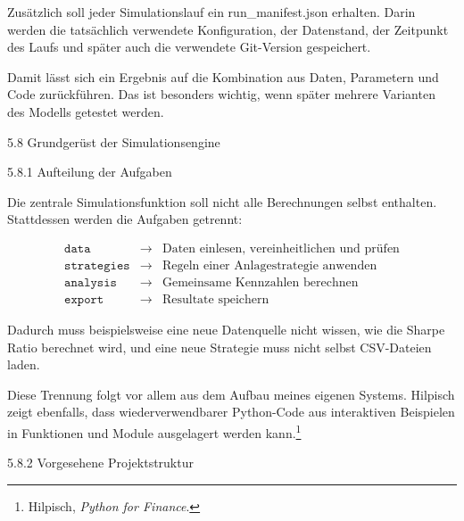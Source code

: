 \documentclass[
  ngerman,
  a4paper,
  DIV=11,
  oneside]{scrreprt}
\begin{document}
Zusätzlich soll jeder Simulationslauf ein run\_manifest.json erhalten.
Darin werden die tatsächlich verwendete Konfiguration, der Datenstand,
der Zeitpunkt des Laufs und später auch die verwendete Git-Version
gespeichert.

Damit lässt sich ein Ergebnis auf die Kombination aus Daten, Parametern
und Code zurückführen. Das ist besonders wichtig, wenn später mehrere
Varianten des Modells getestet werden.

5.8 Grundgerüst der Simulationsengine

5.8.1 Aufteilung der Aufgaben

Die zentrale Simulationsfunktion soll nicht alle Berechnungen selbst
enthalten. Stattdessen werden die Aufgaben getrennt:

\[
\begin{array}{rcl}
\texttt{data} & \longrightarrow & \text{Daten einlesen, vereinheitlichen und prüfen} \\[6pt]
\texttt{strategies} & \longrightarrow & \text{Regeln einer Anlagestrategie anwenden} \\[6pt]
\texttt{analysis} & \longrightarrow & \text{Gemeinsame Kennzahlen berechnen} \\[6pt]
\texttt{export} & \longrightarrow & \text{Resultate speichern}
\end{array}
\]

Dadurch muss beispielsweise eine neue Datenquelle nicht wissen, wie die
Sharpe Ratio berechnet wird, und eine neue Strategie muss nicht selbst
CSV-Dateien laden.

Diese Trennung folgt vor allem aus dem Aufbau meines eigenen Systems.
Hilpisch zeigt ebenfalls, dass wiederverwendbarer Python-Code aus
interaktiven Beispielen in Funktionen und Module ausgelagert werden
kann.\footnote{Hilpisch, \emph{Python for Finance}.}

5.8.2 Vorgesehene Projektstruktur
\end{document}
